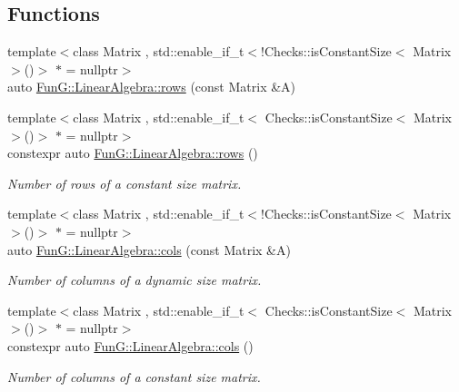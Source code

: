 \subsection*{\-Functions}
\begin{DoxyCompactItemize}
\item 
{\footnotesize template$<$class Matrix , std\-::enable\-\_\-if\-\_\-t$<$!\-Checks\-::is\-Constant\-Size$<$ Matrix $>$()$>$ $\ast$  = nullptr$>$ }\\auto \hyperlink{namespaceFunG_1_1LinearAlgebra_abd3afa2fcd2194787342b2662cfa9f5a}{\-Fun\-G\-::\-Linear\-Algebra\-::rows} (const \-Matrix \&\-A)
\item 
{\footnotesize template$<$class Matrix , std\-::enable\-\_\-if\-\_\-t$<$ Checks\-::is\-Constant\-Size$<$ Matrix $>$()$>$ $\ast$  = nullptr$>$ }\\constexpr auto \hyperlink{namespaceFunG_1_1LinearAlgebra_ab401cccb1259e724bf37d2e198e2ca3d}{\-Fun\-G\-::\-Linear\-Algebra\-::rows} ()
\begin{DoxyCompactList}\small\item\em \-Number of rows of a constant size matrix. \end{DoxyCompactList}\item 
{\footnotesize template$<$class Matrix , std\-::enable\-\_\-if\-\_\-t$<$!\-Checks\-::is\-Constant\-Size$<$ Matrix $>$()$>$ $\ast$  = nullptr$>$ }\\auto \hyperlink{namespaceFunG_1_1LinearAlgebra_ae981b8bee32eea3ce87f41874835c9c1}{\-Fun\-G\-::\-Linear\-Algebra\-::cols} (const \-Matrix \&\-A)
\begin{DoxyCompactList}\small\item\em \-Number of columns of a dynamic size matrix. \end{DoxyCompactList}\item 
{\footnotesize template$<$class Matrix , std\-::enable\-\_\-if\-\_\-t$<$ Checks\-::is\-Constant\-Size$<$ Matrix $>$()$>$ $\ast$  = nullptr$>$ }\\constexpr auto \hyperlink{namespaceFunG_1_1LinearAlgebra_a9eb685419fe4c5f91619d5aa0f973320}{\-Fun\-G\-::\-Linear\-Algebra\-::cols} ()
\begin{DoxyCompactList}\small\item\em \-Number of columns of a constant size matrix. \end{DoxyCompactList}\end{DoxyCompactItemize}
